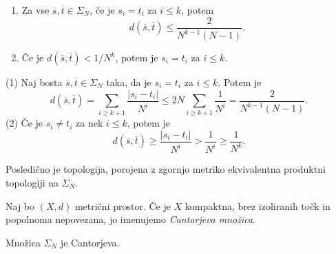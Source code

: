 \begin{lema} \label{lem:seq-metric} \mbox{}
    \begin{enumerate}[label=(\arabic*)]
        \item Za vse \(\overline{s}, \overline{t} \in \Sigma_N\), če je \(s_i = t_i\) za \(i \leq k\), potem \[d (\overline{s}, \overline{t}) \leq \frac{2}{N^{k - 1} (N - 1)}.\]
        \item Če je \(d (\overline{s}, \overline{t}) < 1 / N^k\), potem je \(s_i = t_i\) za \(i \leq k\).
    \end{enumerate}
\end{lema}

\begin{dokaz}
    (1) Naj bosta \(\overline{s}, \overline{t} \in \Sigma_N\) taka, da je \(s_i = t_i\) za \(i \leq k\). Potem je
    \[d (\overline{s}, \overline{t}) = \sum_{i \geq k + 1} \frac{|s_i - t_i|}{N^i} \leq 2 N \sum_{i \geq k + 1} \frac{1}{N^i} = \frac{2}{N^{k - 1} (N - 1)}.\]
    (2) Če je \(s_i \neq t_i\) za nek \(i \leq k\), potem je
    \[d (\overline{s}, \overline{t}) \geq \frac{|s_i - t_i|}{N^i} > \frac{1}{N^i} \geq \frac{1}{N^k}.\]
\end{dokaz}

\noindent Posledično je topologija, porojena z zgornjo metriko ekvivalentna produktni topologiji na \(\Sigma_N\).

\begin{definicija}
    Naj bo \((X, d)\) metrični prostor. Če je \(X\) kompaktna, brez izoliranih točk in popolnoma nepovezana, jo imenujemo \emph{Cantorjeva množica}.
\end{definicija}

\begin{trditev}
    Množica \(\Sigma_N\) je Cantorjeva.
\end{trditev}

\begin{dokaz}
    
\end{dokaz}
